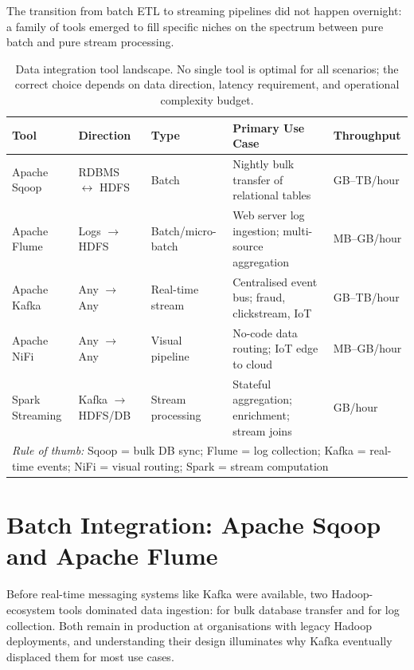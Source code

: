 The transition from batch ETL to streaming pipelines did not happen
overnight: a family of tools emerged to fill specific niches on the
spectrum between pure batch and pure stream processing.

\begin{table}[htbp]
\centering
\renewcommand{\arraystretch}{1.35}
\begin{tabular}{lllp{4.2cm}l}
  \toprule
  \textbf{Tool} & \textbf{Direction} & \textbf{Type}
    & \textbf{Primary Use Case} & \textbf{Throughput} \\
  \midrule
  Apache Sqoop
    & RDBMS $\leftrightarrow$ HDFS
    & Batch
    & Nightly bulk transfer of relational tables
    & GB--TB/hour \\
  Apache Flume
    & Logs $\to$ HDFS
    & Batch/micro-batch
    & Web server log ingestion; multi-source aggregation
    & MB--GB/hour \\
  Apache Kafka
    & Any $\to$ Any
    & Real-time stream
    & Centralised event bus; fraud, clickstream, IoT
    & GB--TB/hour \\
  Apache NiFi
    & Any $\to$ Any
    & Visual pipeline
    & No-code data routing; IoT edge to cloud
    & MB--GB/hour \\
  Spark Streaming
    & Kafka $\to$ HDFS/DB
    & Stream processing
    & Stateful aggregation; enrichment; stream joins
    & GB/hour \\
  \midrule
  \multicolumn{5}{l}{\small \textit{Rule of thumb:}
    Sqoop = bulk DB sync;\;
    Flume = log collection;\;
    Kafka = real-time events;\;
    NiFi = visual routing;\;
    Spark = stream computation} \\
  \bottomrule
\end{tabular}
\caption{Data integration tool landscape. No single tool is optimal for
         all scenarios; the correct choice depends on data direction, latency
         requirement, and operational complexity budget.}
\label{tab:tool-landscape}
\end{table}

\section{Batch Integration: Apache Sqoop and Apache Flume}
\label{sec:batch-integration}

Before real-time messaging systems like Kafka were available, two
Hadoop-ecosystem tools dominated data ingestion: 
for bulk database transfer and  for log collection.
Both remain in production at organisations with legacy Hadoop deployments,
and understanding their design illuminates why Kafka eventually displaced
them for most use cases.

